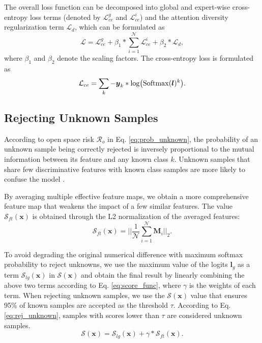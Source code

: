 \documentclass[letterpaper]{article} %
\begin{document}
The overall loss function can be decomposed into global and expert-wise cross-entropy loss terms (denoted by $\mathcal{L}_{ce}^g$ and $\mathcal{L}_{ce}^i$) and the attention diversity regularization term $\mathcal{L}_d$, which can be formulated as
\begin{equation}
\mathcal{L}=\mathcal{L}_{ce}^g+\beta_1*\sum_{i=1}^{\mathcal{N}}\mathcal{L}_{ce}^i+\beta_2*\mathcal{L}_d,
\label{eq:loss_full}
\end{equation}
where $\beta_1$ and $\beta_2$ denote the scaling factors. The cross-entropy loss is formulated as
\begin{equation}
\mathcal{L}_{ce}=\sum_k-\boldsymbol{y}_k*{\rm log}\big({\rm Softmax}(\boldsymbol{l})^k\big).
\label{eq:cross_perb}
\end{equation}

\subsection{Rejecting Unknown Samples}
According to open space risk $\mathcal{R}_o$ in Eq. \eqref{eq:prob_unknown}, the probability of an unknown sample being correctly rejected is inversely proportional to the mutual information between its feature and any known class $k$. Unknown samples that share few discriminative features with known class samples are more likely to confuse the model \cite{moon2022difficulty}.

By averaging multiple effective feature maps, we obtain a more comprehensive feature map that weakens the impact of a few similar features. The value $\mathcal{S}_{ft}(\boldsymbol{x})$ is obtained through the L2 normalization of the averaged features:
\begin{equation}
\mathcal{S}_{ft}(\boldsymbol{x})=\Big|\Big|\frac{1}{\mathcal{N}}{\sum_{i=1}^\mathcal{N}\boldsymbol{M}_i}\Big|\Big|_2.
\label{eq:score_ft}
\end{equation}

To avoid degrading the original numerical difference with maximum softmax probability to reject unknowns,
we use the maximum value of the logits $\boldsymbol{l}_g$ as a term $\mathcal{S}_{lg}(\boldsymbol{x})$ in $\mathcal{S}(\boldsymbol{x})$ and obtain the final result by linearly combining the above two terms according to Eq. \eqref{eq:score_func}, where $\gamma$ is the weights of each term. When rejecting unknown samples, we use the $\mathcal{S}(\boldsymbol{x})$ value that ensures 95\% of known samples are accepted as the threshold $\tau$. According to Eq. \eqref{eq:rej_unknown}, samples with scores lower than $\tau$ are considered unknown samples.
\begin{equation}
\mathcal{S}(\boldsymbol{x})=\mathcal{S}_{lg}(\boldsymbol{x})+\gamma*\mathcal{S}_{ft}(\boldsymbol{x}).
\label{eq:score_func}
\end{equation}
\end{document}
